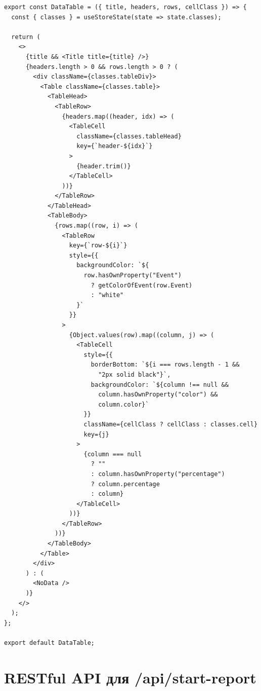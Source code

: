 \begin{lstlisting}
export const DataTable = ({ title, headers, rows, cellClass }) => {
  const { classes } = useStoreState(state => state.classes);

  return (
    <>
      {title && <Title title={title} />}
      {headers.length > 0 && rows.length > 0 ? (
        <div className={classes.tableDiv}>
          <Table className={classes.table}>
            <TableHead>
              <TableRow>
                {headers.map((header, idx) => (
                  <TableCell
                    className={classes.tableHead}
                    key={`header-${idx}`}
                  >
                    {header.trim()}
                  </TableCell>
                ))}
              </TableRow>
            </TableHead>
            <TableBody>
              {rows.map((row, i) => (
                <TableRow
                  key={`row-${i}`}
                  style={{
                    backgroundColor: `${
                      row.hasOwnProperty("Event")
                        ? getColorOfEvent(row.Event)
                        : "white"
                    }`
                  }}
                >
                  {Object.values(row).map((column, j) => (
                    <TableCell
                      style={{
                        borderBottom: `${i === rows.length - 1 &&
                          "2px solid black"}`,
                        backgroundColor: `${column !== null &&
                          column.hasOwnProperty("color") &&
                          column.color}`
                      }}
                      className={cellClass ? cellClass : classes.cell}
                      key={j}
                    >
                      {column === null
                        ? ""
                        : column.hasOwnProperty("percentage")
                        ? column.percentage
                        : column}
                    </TableCell>
                  ))}
                </TableRow>
              ))}
            </TableBody>
          </Table>
        </div>
      ) : (
        <NoData />
      )}
    </>
  );
};

export default DataTable;
\end{lstlisting}

\chapter{RESTful API для /api/start-report}
\label{appendix:ReliseRESTfulAPI}

